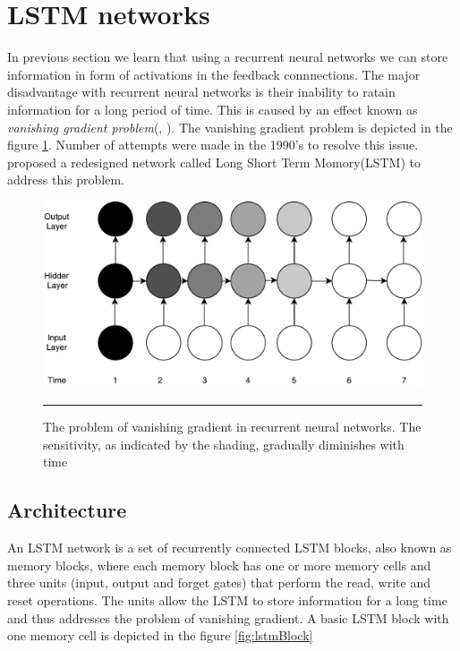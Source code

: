 \section{LSTM networks}
In previous section we learn that using a recurrent neural networks we can store information in
form of activations in the feedback connnections. The major disadvantage with recurrent neural
networks is their inability to ratain information for a long period of time. This is caused by an
effect known as \emph{vanishing gradient problem}(\citet{bengio1994learning},
\citet{hochreiter2001gradient}). The vanishing gradient problem is depicted in the figure
\ref{fig:vanishingGradient}. Number of attempts were made in the 1990's to resolve this issue.
\citet{hochreiter1997long} proposed a redesigned network called Long Short Term Momory(LSTM) to
address this problem.

\begin{figure}[htbp]
  \centering
    \includegraphics[width=\textwidth,height=\textheight,keepaspectratio]
    {Figures/vanishing-gradient.pdf}
    \rule{35em}{0.5pt}
  \caption[Vanishing Gradient] {The problem of vanishing gradient in recurrent neural networks.
  The sensitivity, as indicated by the shading, gradually diminishes with time}
  \label{fig:vanishingGradient}
\end{figure}


\subsection{Architecture}
An LSTM network is a set of recurrently connected LSTM blocks, also known as memory blocks, where
each memory block has one or more memory cells and three units (input, output and forget gates)
that perform the read, write and reset operations. The units allow the LSTM to store information
for a long time and thus addresses the problem of vanishing gradient. A basic LSTM block with one
memory cell is depicted in the figure \ref{fig:lstmBlock}

